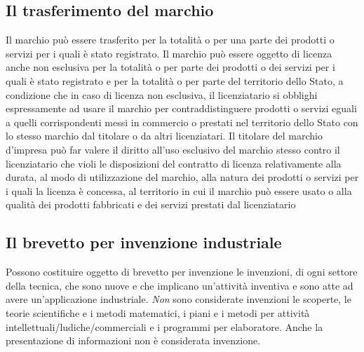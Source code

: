 \subsection{Il trasferimento del marchio}
Il marchio può essere trasferito per la totalità o per una parte dei prodotti o servizi per i quali è stato registrato. \newline
Il marchio può essere oggetto di licenza anche non esclusiva per la totalità o per parte dei prodotti o dei servizi
per i quali è stato registrato e per la totalità o per parte del territorio dello Stato, a condizione che in caso di licenza non esclusiva,
il licenziatario si obblighi espressamente ad usare il marchio per contraddistinguere prodotti o servizi eguali a quelli corrispondenti
messi in commercio o prestati nel territorio dello Stato con lo stesso marchio dal titolare o da altri licenziatari. \newline
Il titolare del marchio d'impresa può far valere il diritto all'uso esclusivo del marchio stesso contro il licenziatario che violi le disposizioni
del contratto di licenza relativamente alla durata, al modo di utilizzazione del marchio, alla natura dei prodotti o servizi per i quali la licenza
è concessa, al territorio in cui il marchio può essere usato o alla qualità dei prodotti fabbricati e dei servizi prestati dal
licenziatario

\subsection{Il brevetto per invenzione industriale}
Possono costituire oggetto di brevetto per invenzione le invenzioni, di ogni settore della tecnica, che sono nuove e che implicano
un'attività inventiva e sono atte ad avere un'applicazione industriale.\newline
\emph{Non} sono considerate invenzioni le scoperte, le teorie scientifiche e i metodi matematici, i piani
e i metodi per attività intellettuali/ludiche/commerciali e i programmi per elaboratore. Anche la presentazione di informazioni non è
considerata invenzione.\newline

